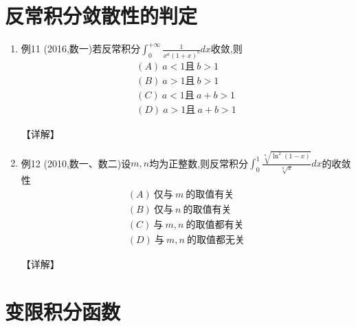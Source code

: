 \documentclass[12pt, a4paper, oneside, UTF8]{ctexbook}
\begin{document}
\section{ 反常积分敛散性的判定}

\begin{enumerate}[label=\arabic*.,start=10]
    \item 例11 (2016,数一)若反常积分$\int_0^{+\infty}\frac{1}{x^a(1+x)^b} dx$收敛,则
    \begin{align*}
        (A)\ a<1且\ b>1 \\
        (B)\ a>1且\ b>1 \\
        (C)\ a<1且\ a+b>1 \\
        (D)\ a>1且\ a+b>1
    \end{align*}
    
    \begin{solution}
    【详解】
    \end{solution}
    
    \item 例12 (2010,数一、数二)设$m,n$均为正整数,则反常积分$\int_0^1\frac{\sqrt[n]{\ln^2(1-x)}}{\sqrt[n]{x}} dx$的收敛性
    \begin{align*}
        (A)\ 仅与\ m\ 的取值有关 \\
        (B)\ 仅与\ n\ 的取值有关 \\
        (C)\ 与\ m,n\ 的取值都有关 \\
        (D)\ 与\ m,n\ 的取值都无关
    \end{align*}
    
    \begin{solution}
    【详解】
    \end{solution}
\end{enumerate}

\section{ 变限积分函数}
\end{document}
